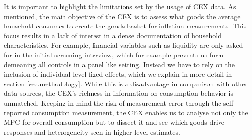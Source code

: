 It is important to highlight the limitations set by the usage of CEX data. As mentioned, the main objective of the CEX is to assess what goods the average household consumes to create the goods basket for inflation measurements. This focus results in a lack of interest in a dense documentation of household characteristics. For example, financial variables such as liquidity are only asked for in the initial screening interview, which for example prevents us form demeaning all controls in a panel like setting. Instead we have to rely on the inclusion of individual level fixed effects, which we explain in more detail in section \ref{sec:methodology}. While this is a disadvantage in comparison with other data sources, the CEX's richness in information on consumption behavior is unmatched. Keeping in mind the risk of measurement error through the self-reported consumption measurement, the CEX enables us to analyse not only the MPC for overall consumption but to dissect it and see which goods drive responses and heterogeneity seen in higher level estimates.